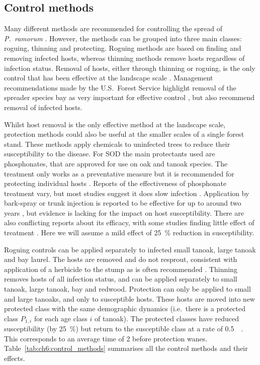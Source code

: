 \subsection{Control methods}

Many different methods are recommended for controlling the spread of \textit{P.~ramorum} \citep{swiecki_reference_2013}. However, the methods can be grouped into three main classes: roguing, thinning and protecting. Roguing methods are based on finding and removing infected hosts, whereas thinning methods remove hosts regardless of infection status. Removal of hosts, either through thinning or roguing, is the only control that has been effective at the landscape scale \citep{hansen_epidemiology_2008}. Management recommendations made by the U.S.\ Forest Service highlight removal of the spreader species bay as very important for effective control \citep{swiecki_reference_2013}, but also recommend removal of infected hosts.

Whilst host removal is the only effective method at the landscape scale, protection methods could also be useful at the smaller scales of a single forest stand. These methods apply chemicals to uninfected trees to reduce their susceptibility to the disease. For SOD the main protectants used are phosphonates, that are approved for use on oak and tanoak species. The treatment only works as a preventative measure but it is recommended for protecting individual hosts \citep{lee_protecting_2010}. Reports of the effectiveness of phosphonate treatment vary, but most studies suggest it does slow infection \citep{swiecki_reference_2013}. Application by bark-spray or trunk injection is reported to be effective for up to around two years \citep{garbelotto_phosphonate_2009}, but evidence is lacking for the impact on host susceptibility. There are also conflicting reports about its efficacy, with some studies finding little effect of treatment \citep{kanaskie_application_2011}. Here we will assume a mild effect of \SI{25}{\percent} reduction in susceptibility.

Roguing controls can be applied separately to infected small tanoak, large tanoak and bay laurel. The hosts are removed and do not resprout, consistent with application of a herbicide to the stump as is often recommended \citep{swiecki_reference_2013}. Thinning removes hosts of all infection status, and can be applied separately to small tanoak, large tanoak, bay and redwood. Protection can only be applied to small and large tanoaks, and only to susceptible hosts. These hosts are moved into new protected class with the same demographic dynamics (i.e.\ there is a protected class $P_{1,i}$ for each age class $i$ of tanoak). The protected classes have reduced susceptibility (by \SI{25}{\percent}) but return to the susceptible class at a rate of \SI{0.5}{\per\year}. This corresponds to an average time of \SI{2}{\years} before protection wanes. Table~\ref{tab:ch6:control_methods} summarises all the control methods and their effects.

